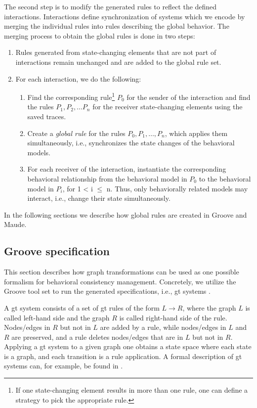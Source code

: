 \documentclass{jot}
\begin{document}
The second step is to modify the generated rules to reflect the defined interactions.
Interactions define synchronization of systems which we encode by merging the individual rules into rules describing the global behavior.
The merging process to obtain the global rules is done in two steps:

\begin{enumerate}
    \item Rules generated from state-changing elements that are not part of interactions remain unchanged and are added to the global rule set.
    \item For each interaction, we do the following:
     \begin{enumerate}
         \item Find the corresponding rule\footnote{If one state-changing element results in more than one rule, one can define a strategy to pick the appropriate rule.} $P_0$ for the sender of the interaction and find the rules $P_1, P_2, \ldots P_n$ for the receiver state-changing elements using the saved traces.
         \item Create a \emph{global rule} for the rules $P_0, P_1, \ldots, P_n$, which applies them simultaneously, i.e., synchronizes the state changes of the behavioral models.
         \item For each receiver of the interaction, instantiate the corresponding behavioral relationship from the behavioral model in $P_0$ to the behavioral model in $P_i$, for 1 < i $\leq$ n.
         Thus, only behaviorally related models may interact, i.e., change their state simultaneously.
     \end{enumerate}
\end{enumerate}

In the following sections we describe how global rules are created in Groove and Maude.


\subsection{Groove specification} 
This section describes how graph transformations can be used as one possible formalism for behavioral consistency management.
Concretely, we utilize the Groove tool set to run the generated specifications, i.e., \gls*{gt} systems \cite{rensinkGROOVESimulatorTool2004}.

A \gls*{gt} system consists of a set of \gls*{gt} rules of the form $L \to R$, where the graph $L$ is called left-hand side and the graph $R$ is called right-hand side of the rule.
Nodes/edges in $R$ but not in $L$ are added by a rule, while nodes/edges in $L$ and $R$ are preserved, and a rule deletes nodes/edges that are in $L$ but not in $R$.
Applying a \gls*{gt} system to a given graph one obtains a state space where each state is a graph, and each transition is a rule application.
A formal description of \gls*{gt} systems can, for example, be found in \cite{ehrigFundamentalsAlgebraicGraph2006}. %
\end{document}

